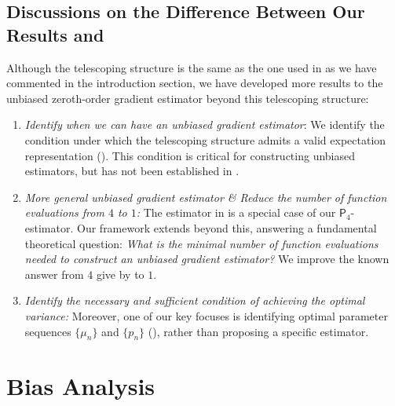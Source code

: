 \documentclass{article}
\theoremstyle{definition}
\theoremstyle{plain}
\theoremstyle{remark}
\begin{document}
\subsection{Discussions on the Difference Between Our Results and \citet{chen2020unbiased}}
Although the telescoping structure is the same as the one used in \citet{chen2020unbiased} as we have commented in the introduction section, we have developed more results to the unbiased zeroth-order gradient estimator beyond this telescoping structure:
\begin{enumerate}
    \item \textit{Identify when we can have an unbiased gradient estimator}: We identify the condition under which the telescoping structure admits a valid expectation representation (). This condition is critical for constructing unbiased estimators, but has not been established in \citet{chen2020unbiased}. 
    
    \item \textit{More general unbiased gradient estimator \& Reduce the number of function evaluations from $4$ to $1$:}  The estimator in \citet{chen2020unbiased} is a special case of our 
$\mathsf{P}_4$-estimator. Our framework extends beyond this, answering a fundamental theoretical question: \textit{What is the minimal number of function evaluations needed to construct an unbiased gradient estimator?} We improve the known answer from $4$ give by \citet{chen2020unbiased} to $1$. 
    \item \textit{Identify the necessary and sufficient condition of achieving the optimal variance:}  Moreover, one of our key focuses is identifying optimal parameter sequences 
 $\{\mu_n\}$ and $\{p_n\}$
 (), rather than proposing a specific estimator.  
\end{enumerate}

 
\section{Bias Analysis}\label{appendix:bias}
\end{document}
